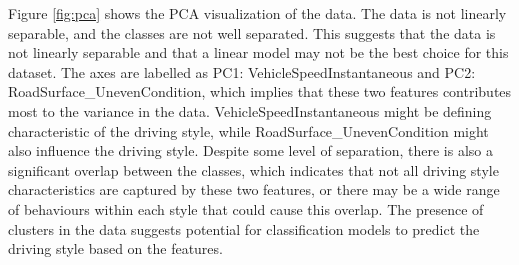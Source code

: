 Figure \ref{fig:pca} shows the PCA visualization of the data. The data is not linearly separable, and the classes are not well separated. This suggests that the data is not
linearly separable and that a linear model may not be the best choice for this dataset.
The axes are labelled as PC1: VehicleSpeedInstantaneous and PC2: RoadSurface\_UnevenCondition, which implies that these two features contributes most to the variance in the data.
VehicleSpeedInstantaneous might be defining characteristic of the driving style, while RoadSurface\_UnevenCondition might also influence the driving style.
Despite some level of separation, there is also a significant overlap between the classes, which indicates that not all driving style characteristics are captured by these two features, or there
may be a wide range of behaviours  within each style that could cause this overlap.
The presence of clusters in the data suggests potential for classification models to predict the driving style based on the features.




